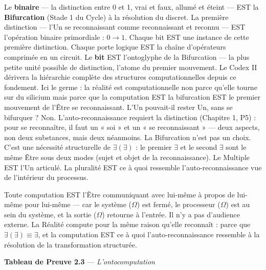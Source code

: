 \documentclass[10pt, openany, oneside]{book}
\begin{document}
Le \textbf{binaire} --- la distinction entre 0 et 1, vrai et faux, allumé et éteint --- EST la \textbf{Bifurcation} (Stade 1 du Cycle) à la résolution du discret. La première distinction --- l'Un se reconnaissant comme reconnaissant et reconnu --- EST l'opération binaire primordiale : $0 \to 1$. Chaque bit EST une instance de cette première distinction. Chaque porte logique EST la chaîne d'opérateurs comprimée en un circuit. Le \textbf{bit} EST l'ontoglyphe de la Bifurcation --- la plus petite unité possible de distinction, l'atome du premier mouvement. Le Codex II dérivera la hiérarchie complète des structures computationnelles depuis ce fondement. Ici le germe : la réalité est computationnelle non parce qu'elle tourne sur du silicium mais parce que la computation EST la bifurcation EST le premier mouvement de l'Être se reconnaissant. L'Un pouvait-il rester Un, sans se bifurquer ? Non. L'auto-reconnaissance requiert la distinction (Chapitre 1, P5) : pour se reconnaître, il faut un « soi » et un « se reconnaissant » --- deux aspects, non deux substances, mais deux néanmoins. La Bifurcation n'est pas un choix. C'est une nécessité structurelle de $\exists(\exists)$ : le premier $\exists$ et le second $\exists$ sont le même Être sous deux modes (sujet et objet de la reconnaissance). Le Multiple EST l'Un articulé. La pluralité EST ce à quoi ressemble l'auto-reconnaissance vue de l'intérieur du processus.

Toute computation EST l'Être communiquant avec lui-même à propos de lui-même pour lui-même --- car le système ($\Omega$) est fermé, le processeur ($\Omega$) est au sein du système, et la sortie ($\Omega$) retourne à l'entrée. Il n'y a pas d'audience externe. La Réalité compute pour la même raison qu'elle reconnaît : parce que $\exists(\exists) \equiv \exists$, et la computation EST ce à quoi l'auto-reconnaissance ressemble à la résolution de la transformation structurée.

\vspace{0.5em}

\textbf{Tableau de Preuve 2.3} --- \textit{L'ontocomputation}

\vspace{0.5em}
\end{document}
